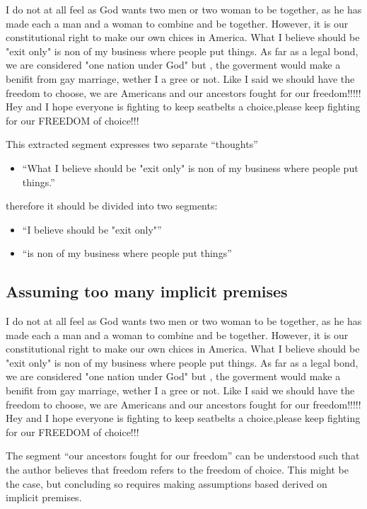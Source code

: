 \begin{mydef}
I do not at all feel as God wants two men or two woman to be together, as he
has made each a man and a woman to combine and be together. However, it is our
constitutional right to make our own chices in America. What I believe should
be "exit only" is non of my business where people put things. As far as a legal
bond, we are considered "one nation under God" but , the goverment would make a
benifit from gay marriage, wether I a gree or not. Like I said we should have
the freedom to choose, we are Americans and our ancestors fought for our
freedom!!!!! Hey and I hope everyone is fighting to keep seatbelts a
choice,please keep fighting for our FREEDOM of choice!!!
\end{mydef}
This extracted segment expresses two separate ``thoughts''
\begin{itemize}
\item[] ``What I believe should be "exit only" is non of my business where people put
things.''
\end{itemize}
therefore it should be divided into two segments:
\begin{itemize}
\item[]  ``I believe should be "exit only"''
\item[] ``is non of my business where people put things''
\end{itemize}

\subsection{Assuming too many implicit premises}

\begin{mydef}
I do not at all feel as God wants two men or two woman to be together, as he
has made each a man and a woman to combine and be together. However, it is our
constitutional right to make our own chices in America. What I believe should
be "exit only" is non of my business where people put things. As far as a legal
bond, we are considered "one nation under God" but , the goverment would make a
benifit from gay marriage, wether I a gree or not. Like I said we should have
the freedom to choose, we are Americans and our ancestors fought for our
freedom!!!!! Hey and I hope everyone is fighting to keep seatbelts a
choice,please keep fighting for our FREEDOM of choice!!!
\end{mydef}
The segment ``our ancestors fought for our freedom'' can be understood
such that the author believes that freedom refers to the freedom of choice.
This might be the case, but concluding so requires making assumptions based 
derived on implicit premises. 

